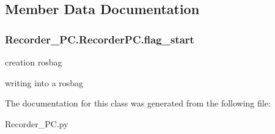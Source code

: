 \subsection{Member Data Documentation}
\subsubsection[{\texorpdfstring{flag\+\_\+start}{flag_start}}]{\setlength{\rightskip}{0pt plus 5cm}Recorder\+\_\+\+P\+C.\+Recorder\+P\+C.\+flag\+\_\+start}\hypertarget{classRecorder__PC_1_1RecorderPC_aff33d03c0a4ccab6d6a6b474af57592e}{}\label{classRecorder__PC_1_1RecorderPC_aff33d03c0a4ccab6d6a6b474af57592e}


creation rosbag 

writing into a rosbag 

The documentation for this class was generated from the following file\+:\begin{DoxyCompactItemize}
\item 
Recorder\+\_\+\+P\+C.\+py\end{DoxyCompactItemize}
